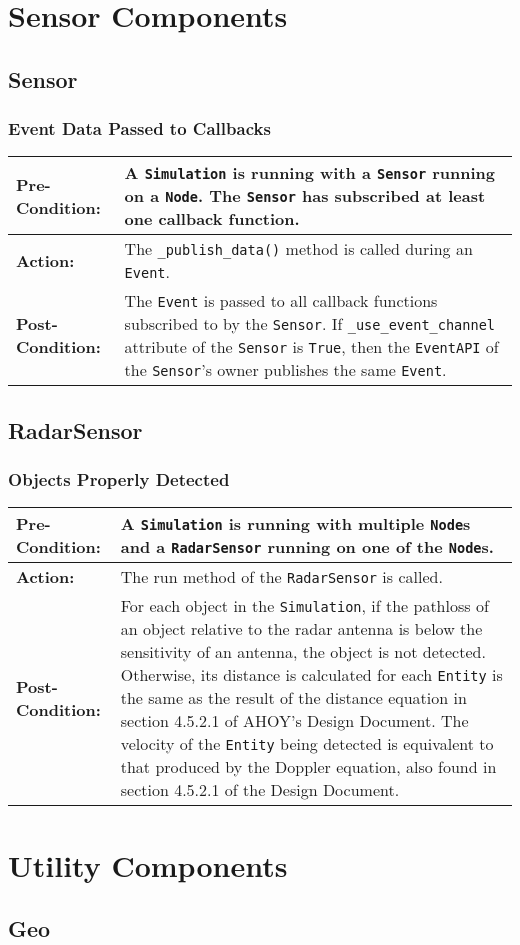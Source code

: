 \documentclass[titlepage]{article}
\newcommand{\testcase}[3]{
    \begin{center}
    \begin{tabular}{| l | p{0.7\textwidth}|}
        \hline
        \rowcolor[gray]{0.8}\textbf{Pre-Condition:} & #1 \\ \hline
        \textbf{Action:} & #2 \\ \hline
        \rowcolor[gray]{0.8}\textbf{Post-Condition:} & #3 \\ \hline
    \end{tabular}
    \end{center}
}
\begin{document}
\section{Sensor Components}
\subsection{Sensor}
\subsubsection{Event Data Passed to Callbacks}
\testcase{A \texttt{Simulation} is running with a \texttt{Sensor} running on a \texttt{Node}. The \texttt{Sensor} has subscribed at least one callback function.}{The \texttt{\_publish\_data()} method is called during an \texttt{Event}.}{The \texttt{Event} is passed to all callback functions subscribed to by the \texttt{Sensor}. If \texttt{\_use\_event\_channel} attribute of the \texttt{Sensor} is \texttt{True}, then the \texttt{EventAPI} of the \texttt{Sensor}'s owner publishes the same \texttt{Event}.}

\subsection{RadarSensor}
\subsubsection{Objects Properly Detected}
\testcase{A \texttt{Simulation} is running with multiple \texttt{Node}s and a \texttt{RadarSensor} running on one of the \texttt{Node}s.}{The run method of the \texttt{RadarSensor} is called.}{For each object in the \texttt{Simulation}, if the pathloss of an object relative to the radar antenna is below the sensitivity of an antenna, the object is not detected.  Otherwise, its distance is calculated for each \texttt{Entity} is the same as the result of the distance equation in section 4.5.2.1 of AHOY's Design Document. The velocity of the \texttt{Entity} being detected is equivalent to that produced by the Doppler equation, also found in section 4.5.2.1 of the Design Document.}

\section{Utility Components}
\subsection{Geo}
\end{document}
